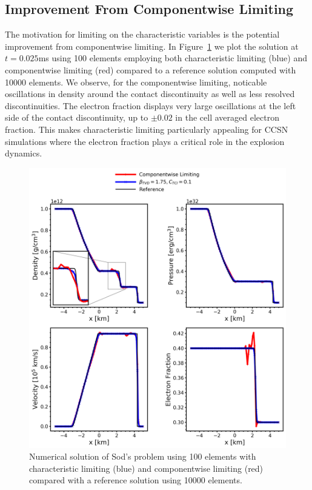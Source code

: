 \documentclass[onecolumn]{aastex62}
\begin{document}
\subsection{Improvement From Componentwise Limiting}
\label{sec:optimal}
The motivation for limiting on the characteristic variables is the potential
improvement from componentwise limiting. In Figure~\ref{fig:SodSedovCW} we plot the
solution at $t = 0.025$ms using 100 elements employing both characteristic
limiting (blue) and componentwise limiting (red) compared to a reference
solution computed with 10000 elements. We observe, for the componentwise limiting,
noticable oscillations in density around the contact discontinuity as well
as less resolved discontinuities. The electron fraction displays very
large oscillations at the left side of the contact discontinuity, up to
$\pm 0.02$ in the cell averaged electron fraction. This makes characteristic
limiting particularly appealing for CCSN simulations where the electron fraction
plays a critical role in the explosion dynamics.


\begin{figure}[h!]
  \centering
  \includegraphics[width=36pc]{./figures/characteristic_cw.png}
  \caption{\label{fig:SodSedovCW} Numerical solution of Sod's problem using
  100 elements with characteristic limiting (blue) and componentwise limiting
  (red) compared with a reference solution using 10000 elements.}
\end{figure}
\end{document}

